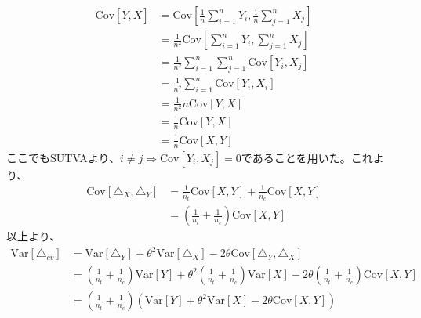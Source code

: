 \begin{align}
    \text{Cov}[\bar{Y}, \bar{X}] & = \text{Cov}\left[\frac{1}{n}\sum_{i = 1}^{n}Y_{i}, \frac{1}{n}\sum_{j = 1}^{n}X_{j}\right] \\
                                 & = \frac{1}{n^{2}}\text{Cov}\left[\sum_{i = 1}^{n}Y_{i}, \sum_{j = 1}^{n}X_{j}\right]        \\
                                 & = \frac{1}{n^{2}} \sum_{i = 1}^{n}\sum_{j = 1}^{n} \text{Cov}[Y_{i}, X_{j}]                 \\
                                 & = \frac{1}{n^{2}} \sum_{i = 1}^{n} \text{Cov}[Y_{i}, X_{i}]                                 \\
                                 & = \frac{1}{n^{2}} n \text{Cov}[Y, X]                                                        \\
                                 & = \frac{1}{n} \text{Cov}[Y, X]                                                              \\
                                 & = \frac{1}{n} \text{Cov}[X, Y]
\end{align}
ここでもSUTVAより、$i \neq j \Rightarrow \text{Cov}[Y_{i}, X_{j}] = 0$であることを用いた。これより、
\begin{align}
    \text{Cov}[\triangle_{X}, \triangle_{Y}] & =  \frac{1}{n_{t}} \text{Cov}[X, Y] + \frac{1}{n_{c}} \text{Cov}[X, Y] \\
                                             & = \left(\frac{1}{n_{t}} + \frac{1}{n_{c}}\right)\text{Cov}[X, Y]
\end{align}
以上より、
\begin{align}
    \text{Var}[\triangle_{cv}] & = \text{Var}[\triangle_{Y}] + \theta^{2}\text{Var}[\triangle_{X}] - 2\theta\text{Cov}[\triangle_{Y}, \triangle_{X}]                                                                                             \\
                               & = \left(\frac{1}{n_{t}} + \frac{1}{n_{c}}\right)\text{Var}[Y] + \theta^{2} \left(\frac{1}{n_{t}} + \frac{1}{n_{c}}\right)\text{Var}[X] - 2\theta \left(\frac{1}{n_{t}} + \frac{1}{n_{c}}\right)\text{Cov}[X, Y] \\
                               & = \left(\frac{1}{n_{t}} + \frac{1}{n_{c}}\right)(\text{Var}[Y] + \theta^{2} \text{Var}[X] - 2\theta \text{Cov}[X, Y])                                                                                           \\
\end{align}
